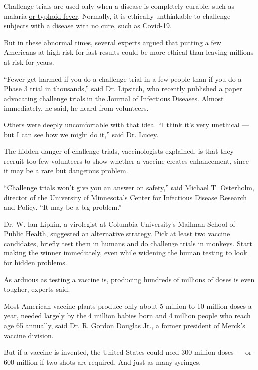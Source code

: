 Challenge trials are used only when a disease is completely curable,
such as malaria
\href{https://www.nytimes3xbfgragh.onion/2017/09/28/health/typhoid-vaccine-trial.html}{or
typhoid fever}. Normally, it is ethically unthinkable to challenge
subjects with a disease with no cure, such as Covid-19.

But in these abnormal times, several experts argued that putting a few
Americans at high risk for fast results could be more ethical than
leaving millions at risk for years.

``Fewer get harmed if you do a challenge trial in a few people than if
you do a Phase 3 trial in thousands,'' said Dr. Lipsitch, who recently
published
\href{https://academic.oup.com/jid/advance-article/doi/10.1093/infdis/jiaa152/5814216}{a
paper advocating challenge trials} in the Journal of Infectious
Diseases. Almost immediately, he said, he heard from volunteers.

Others were deeply uncomfortable with that idea. ``I think it's very
unethical --- but I can see how we might do it,'' said Dr. Lucey.

The hidden danger of challenge trials, vaccinologists explained, is that
they recruit too few volunteers to show whether a vaccine creates
enhancement, since it may be a rare but dangerous problem.

``Challenge trials won't give you an answer on safety,'' said Michael T.
Osterholm, director of the University of Minnesota's Center for
Infectious Disease Research and Policy. ``It may be a big problem.''

Dr. W. Ian Lipkin, a virologist at Columbia University's Mailman School
of Public Health, suggested an alternative strategy. Pick at least two
vaccine candidates, briefly test them in humans and do challenge trials
in monkeys. Start making the winner immediately, even while widening the
human testing to look for hidden problems.

As arduous as testing a vaccine is, producing hundreds of millions of
doses is even tougher, experts said.

Most American vaccine plants produce only about 5 million to 10 million
doses a year, needed largely by the 4 million babies born and 4 million
people who reach age 65 annually, said Dr. R. Gordon Douglas Jr., a
former president of Merck's vaccine division.

But if a vaccine is invented, the United States could need 300 million
doses --- or 600 million if two shots are required. And just as many
syringes.

